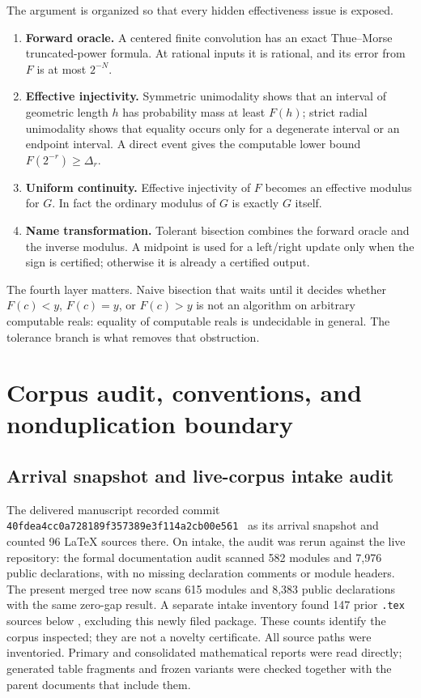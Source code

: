 \documentclass[11pt,oneside]{article}
\theoremstyle{definition}
\theoremstyle{remark}
\numberwithin{equation}{section}
\newcommand{\arrivalcommit}{\nolinkurl{40fdea4cc0a728189f357389e3f114a2cb00e561}}
\begin{document}
The argument is organized so that every hidden effectiveness issue is exposed.

\begin{enumerate}
\item \textbf{Forward oracle.}  A centered finite convolution has an exact
Thue--Morse truncated-power formula.  At rational inputs it is rational, and
its error from $F$ is at most $2^{-N}$.
\item \textbf{Effective injectivity.}  Symmetric unimodality shows that an
interval of geometric length $h$ has probability mass at least $F(h)$;
strict radial unimodality shows that equality occurs only for a degenerate
interval or an endpoint interval.
A direct event gives the computable lower bound $F(2^{-r})\ge\Delta_r$.
\item \textbf{Uniform continuity.}  Effective injectivity of $F$ becomes an
effective modulus for $G$.  In fact the ordinary modulus of $G$ is exactly
$G$ itself.
\item \textbf{Name transformation.}  Tolerant bisection combines the forward
oracle and the inverse modulus.  A midpoint is used for a left/right update
only when the sign is certified; otherwise it is already a certified output.
\end{enumerate}

The fourth layer matters.  Naive bisection that waits until it decides whether
$F(c)<y$, $F(c)=y$, or $F(c)>y$ is not an algorithm on arbitrary computable
reals: equality of computable reals is undecidable in general.  The tolerance
branch is what removes that obstruction.

\section{Corpus audit, conventions, and nonduplication boundary}

\subsection{Arrival snapshot and live-corpus intake audit}

The delivered manuscript recorded commit \arrivalcommit\ \cite{ProveIt} as its
arrival snapshot and counted 96 LaTeX sources there.  On intake, the audit was
rerun against the live repository: the formal documentation audit scanned 582
modules and 7,976 public declarations, with no missing declaration comments or
module headers.  The present merged tree now scans 615 modules and 8,383
public declarations with the same zero-gap result.  A separate intake
inventory found 147 prior \texttt{.tex}
sources below , excluding this newly filed
package.  These counts identify the corpus inspected; they are not a novelty
certificate.  All source paths were inventoried.  Primary and consolidated
mathematical reports were read directly; generated table fragments and frozen
variants were checked together with the parent documents that include them.
\end{document}

